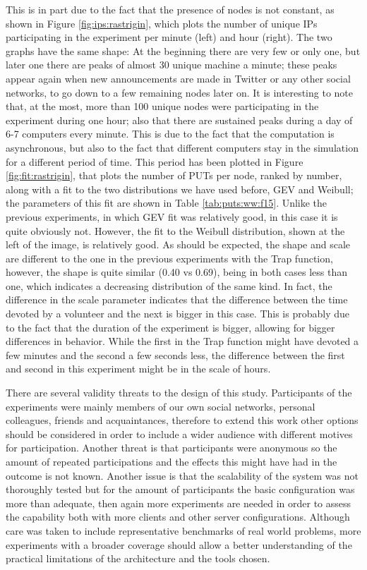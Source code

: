 \documentclass[journal,onecolumn]{IEEEtran}
\begin{document}
This is in part due to the fact that the presence of nodes is not
constant, as shown in Figure \ref{fig:ips:rastrigin}, which plots the
number of unique IPs participating in the experiment per minute (left)
and hour (right). The two graphs have the same shape: At the beginning there are very few or only
one, but later one there are peaks of almost 30 unique machine a
minute; these peaks appear again when new announcements are made in
Twitter or any other social networks, to go down to a few remaining
nodes later on. It is interesting to note that, at the most, more than
100 unique nodes were participating in the experiment during one hour;
also that there are sustained peaks during a day of 6-7 computers
every minute. This is due to the fact that the computation is
asynchronous, but also to the fact that different computers stay in
the simulation for a different period of time. This period has been
plotted in Figure \ref{fig:fit:rastrigin}, that plots the number of
PUTs per node, ranked by number, along with a fit to the two
distributions we have used before, GEV and Weibull; the parameters of
this fit are shown in Table \ref{tab:puts:ww:f15}. Unlike the previous
experiments, in which GEV fit was relatively good, in this case it is
quite obviously not. However, the fit to the Weibull distribution,
shown at the left of the image, is relatively good. As should be
expected, the shape and scale are different to the one in the previous
experiments with the Trap function, however, the shape is quite
similar (0.40 vs 0.69), being in both cases less than one, which
indicates a decreasing distribution of the same kind. In fact, the
difference in the scale parameter indicates that the difference
between the time devoted by a volunteer and the next is bigger in this
case. This is probably due to the fact that the duration of the
experiment is bigger, allowing for bigger differences in
behavior. While the first in the Trap function might have devoted a
few minutes and the second a few seconds less, the difference between
the first and second in this experiment might be in the scale of
hours. 

There are several validity threats to the design of this study.
Participants of the experiments were mainly members of our 
own social networks, personal colleagues, friends 
and acquaintances, therefore to extend this work other options 
should be considered in order to include 
a wider audience with different motives for participation.
Another threat is that participants were anonymous so the amount of repeated 
participations and the effects this might have had in the outcome is not
known. Another issue is that the scalability of the system was not thoroughly tested
but for the amount of participants the basic configuration 
was more than adequate, then again more experiments are needed in order
to assess the capability both with more clients and other server
configurations. Although care was taken to include representative benchmarks
of real world problems, more experiments with a broader coverage 
should allow a better understanding of the practical limitations of
the architecture and the tools chosen.
\end{document}
